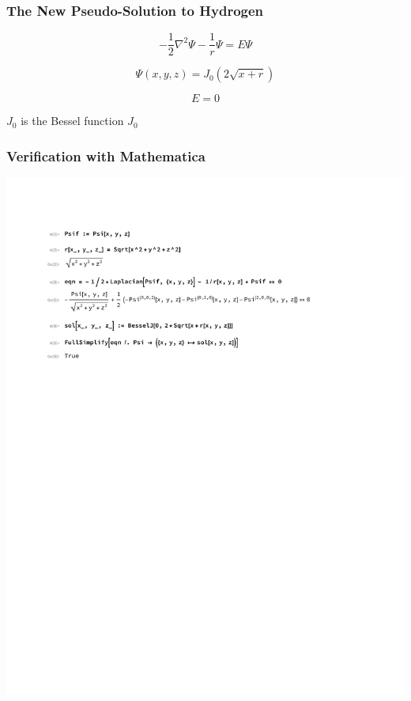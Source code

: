 \documentclass{beamer}
\begin{document}
\begin{frame}
\frametitle{The New Pseudo-Solution to Hydrogen}

\[ - \frac{1}{2} \nabla^2 \Psi - \frac{1}{r} \Psi = E \Psi \]

\[ \Psi(x,y,z) = J_0(2\sqrt{x+r}) \]


\[ E = 0 \]

\vskip 0.5in

$J_0$ is the Bessel function $J_0$

\end{frame}

\begin{frame}
\frametitle{Verification with Mathematica}
\includegraphics[page=1, clip, trim=1in 7in 1in 1in, width=\textwidth]{improved.pdf}
\end{frame}


\end{document}
